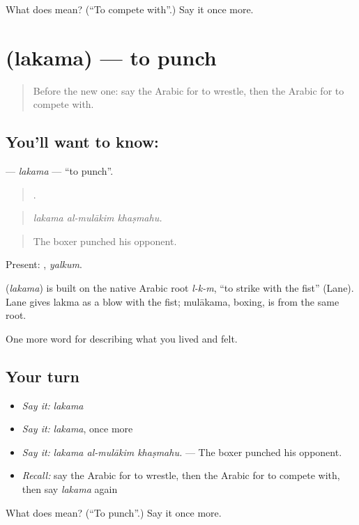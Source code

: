 \begin{tcolorbox}[breakable,colback=teal!4,colframe=teal!35!black,title={Before you move on}]
What does  mean? (\textquotedblleft{}To compete with\textquotedblright{}.) Say it once more.
\end{tcolorbox}
\section[\texorpdfstring{\ar{لكم} (lakama)}{لكم (lakama)}]{ (lakama) — to punch}

\label{lesson:AR-C548-lakama}



\begin{quote}
Before the new one: say the Arabic for to wrestle, then the Arabic for to compete with.
\end{quote}

\subsection*{You'll want to know: }
\textbf{} — \emph{lakama} — \textquotedblleft{}to punch\textquotedblright{}.

\begin{quote}
  .
\end{quote}

\begin{quote}
\emph{lakama al-mulākim khaṣmahu.}
\end{quote}

\begin{quote}
The boxer punched his opponent.
\end{quote}

Present: , \emph{yalkum}.

\begin{cousinweb}
\textbf{} (\emph{lakama}) is built on the native Arabic root \emph{l-k-m}, \textquotedblleft{}to strike with the fist\textquotedblright{} (Lane). Lane gives lakma as a blow with the fist; mulākama, boxing, is from the same root.
\end{cousinweb}

\begin{grammarlens}[title={What you've built}]
One more word for describing what you lived and felt.
\end{grammarlens}

\subsection*{Your turn}
\begin{itemize}
\raggedright
  \item \emph{Say it:} \emph{lakama}
  \item \emph{Say it:} \emph{lakama}, once more
  \item \emph{Say it:} \emph{lakama al-mulākim khaṣmahu.} — The boxer punched his opponent.
  \item \emph{Recall:} say the Arabic for to wrestle, then the Arabic for to compete with, then say \emph{lakama} again
\end{itemize}

\begin{tcolorbox}[breakable,colback=teal!4,colframe=teal!35!black,title={Before you move on}]
What does  mean? (\textquotedblleft{}To punch\textquotedblright{}.) Say it once more.
\end{tcolorbox}
